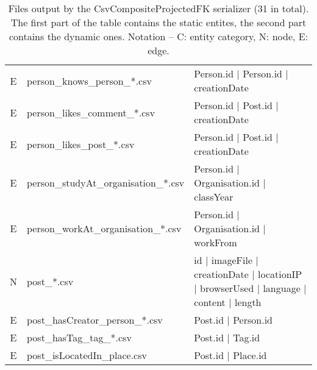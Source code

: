 \begin{table}[htb]
\begin{tabular}{|c|l|l|}
        E                    & person\_knows\_person\_*.csv            & Person.id | Person.id | creationDate                                                                       \\
        E                    & person\_likes\_comment\_*.csv           & Person.id | Post.id | creationDate                                                                         \\
        E                    & person\_likes\_post\_*.csv              & Person.id | Post.id | creationDate                                                                         \\
        E                    & person\_studyAt\_organisation\_*.csv    & Person.id | Organisation.id | classYear                                                                    \\
        E                    & person\_workAt\_organisation\_*.csv     & Person.id | Organisation.id | workFrom                                                                     \\
        \hline
        N                    & post\_*.csv                             & id | imageFile | creationDate | locationIP | browserUsed | language | content | length                     \\
        E                    & post\_hasCreator\_person\_*.csv         & Post.id | Person.id                                                                                        \\
        E                    & post\_hasTag\_tag\_*.csv                & Post.id | Tag.id                                                                                           \\
        E                    & post\_isLocatedIn\_place.csv            & Post.id | Place.id                                                                                         \\
        \hline
    \end{tabular}
    \caption{Files output by the CsvCompositeProjectedFK serializer (31 in total). The first part of the table contains the static entites, the second part contains the dynamic ones. Notation -- C: entity category, N: node, E: edge.}
    \label{table:csv-composite-projectedfk}
\end{table}
